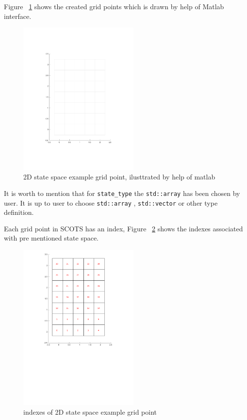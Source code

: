 \documentclass[a4paper]{amsart}
\begin{document}
Figure ~\ref{f:2D-uniformgrid} shows the created grid points which is drawn by help of Matlab interface.

\begin{figure}[h]
\centering
	\includegraphics[width=06cm]{figures/manualp1.pdf}
\caption{2D state space example grid point, ilusttrated by help of matlab}\label{f:2D-uniformgrid}

\end{figure}

It is worth to mention that for {\tt\small state\_type} the {\tt\small std::array} has been chosen by user. It is up to user to choose {\tt\small std::array} , {\tt\small std::vector} or other type definition.


Each grid point in SCOTS has an index, Figure  ~\ref{f:index} shows the indexes associated with pre mentioned state space.

\begin{figure}[h]
\centering
	\includegraphics[width=06cm]{figures/manualp2.pdf}
\caption{indexes of 2D state space example grid point}\label{f:index}

\end{figure}
\end{document}
